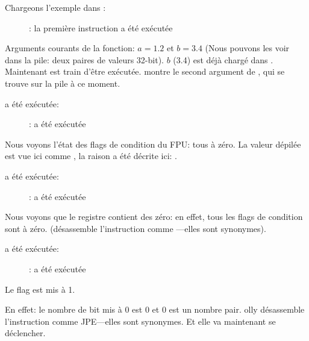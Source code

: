 ﻿\clearpage
{}
\myindex{\olly}

Chargeons l'exemple dans \olly:

\begin{figure}[H]
\centering
{}
\caption{\olly: la première instruction \FLD a été exécutée}
\label{fig:FPU_comparison_case1_olly1}
\end{figure}

Arguments courants de la fonction: $a=1.2$ et $b=3.4$ (Nous pouvons les voir dans
la pile: deux paires de valeurs 32-bit).
$b$ (3.4) est déjà chargé dans .
Maintenant \FCOMP est train d'être exécutée.
\olly montre le second argument de \FCOMP, qui se trouve sur la pile à ce moment.

\clearpage
\FCOMP a été exécutée:

\begin{figure}[H]
\centering
{}
\caption{\olly: \FCOMP a été exécutée}
\label{fig:FPU_comparison_case1_olly2}
\end{figure}

Nous voyons l'état des flags de condition du \ac{FPU}: tous à zéro.
La valeur dépilée est vue ici comme , la raison a été décrite ici:
.

\clearpage
\FNSTSW a été exécutée:
\begin{figure}[H]
\centering
{}
\caption{\olly: \FNSTSW a été exécutée}
\label{fig:FPU_comparison_case1_olly3}
\end{figure}

Nous voyons que le registre  contient des zéro: en effet, tous les flags
de condition sont à zéro.
(\olly désassemble l'instruction \FNSTSW comme ---elles sont synonymes).

\clearpage
\TEST a été exécutée:

\begin{figure}[H]
\centering
{}
\caption{\olly: \TEST a été exécutée}
\label{fig:FPU_comparison_case1_olly4}
\end{figure}

Le flag  est mis à 1.

En effet: le nombre de bit mis à 0 est 0 et 0 est un nombre pair.
olly désassemble l'instruction  comme \ac{JPE}---elles sont synonymes.
Et elle va maintenant se déclencher.

